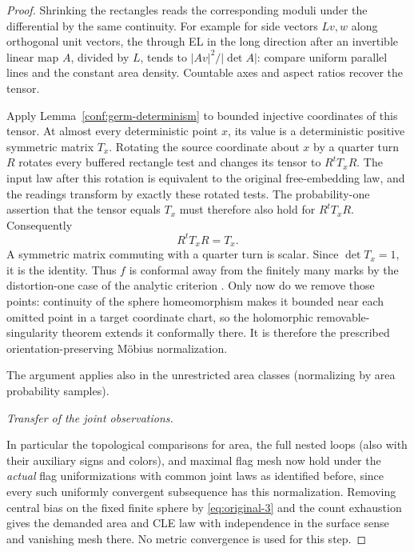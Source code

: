 \begin{proof}
Shrinking the rectangles reads the corresponding moduli under the differential by the same
continuity. For example for side vectors \(Lv,w\) along orthogonal unit vectors, the through EL in
the long direction after an invertible linear map \(A\), divided by \(L\), tends to \(|Av|^2/|\det
A|\): compare uniform parallel lines and the constant area density. Countable axes and aspect ratios
recover the tensor.

Apply Lemma~\ref{conf:germ-determinism} to bounded injective coordinates
of this tensor. At almost every deterministic point \(x\), its value is
a deterministic positive symmetric matrix \(T_x\). Rotating the source
coordinate about \(x\) by a quarter turn \(R\) rotates every buffered
rectangle test and changes its tensor to \(R^tT_xR\). The input law after
this rotation is equivalent to the original free-embedding law, and the
readings transform by exactly these rotated tests. The probability-one
assertion that the tensor equals \(T_x\) must therefore also hold for
\(R^tT_xR\). Consequently
\[
                         R^tT_xR=T_x.
\]
A symmetric matrix commuting with a quarter turn is scalar. Since
\(\det T_x=1\), it is the identity.  Thus \(f\) is conformal away from the
finitely many marks by the distortion-one case of the analytic criterion
\cite[Theorem~2.5.4 and the following paragraph]{AIMQuasiconformal}.
Only now do we remove those points: continuity of the sphere homeomorphism
makes it bounded near each omitted point in a target coordinate chart, so
the holomorphic removable-singularity theorem extends it conformally there.
It is therefore the prescribed orientation-preserving M\"obius normalization.

The argument applies also in the unrestricted area classes (normalizing by area probability samples).

\smallskip\noindent\emph{Transfer of the joint observations.}\par

In particular the topological comparisons for area, the full nested loops (also with their auxiliary
signs and colors), and maximal flag mesh now hold under the \emph{actual} flag uniformizations with
common joint laws as identified before, since every such uniformly convergent subsequence has this
normalization. Removing central bias on the fixed finite sphere by \eqref{eq:original-3} and the
count exhaustion gives the demanded area and CLE law with independence in the surface sense and
vanishing mesh there. No metric convergence is used for this step.

\end{proof}


